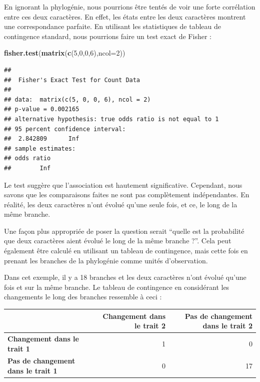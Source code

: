 \documentclass[
]{book}
\newenvironment{Shaded}{\begin{snugshade}}{\end{snugshade}}
\newcommand{\AttributeTok}[1]{\textcolor[rgb]{0.13,0.29,0.53}{#1}}
\newcommand{\DecValTok}[1]{\textcolor[rgb]{0.00,0.00,0.81}{#1}}
\newcommand{\FunctionTok}[1]{\textcolor[rgb]{0.13,0.29,0.53}{\textbf{#1}}}
\newcommand{\NormalTok}[1]{#1}
\begin{document}
En ignorant la phylogénie, nous pourrions être tentés de voir une forte corrélation entre ces deux caractères. En effet, les états entre les deux caractères montrent une correspondance parfaite. En utilisant les statistiques de tableau de contingence standard, nous pourrions faire un test exact de Fisher :

\begin{Shaded}
\begin{Highlighting}[]
\FunctionTok{fisher.test}\NormalTok{(}\FunctionTok{matrix}\NormalTok{(}\FunctionTok{c}\NormalTok{(}\DecValTok{5}\NormalTok{,}\DecValTok{0}\NormalTok{,}\DecValTok{0}\NormalTok{,}\DecValTok{6}\NormalTok{),}\AttributeTok{ncol=}\DecValTok{2}\NormalTok{))}
\end{Highlighting}
\end{Shaded}

\begin{verbatim}
## 
##  Fisher's Exact Test for Count Data
## 
## data:  matrix(c(5, 0, 0, 6), ncol = 2)
## p-value = 0.002165
## alternative hypothesis: true odds ratio is not equal to 1
## 95 percent confidence interval:
##  2.842809      Inf
## sample estimates:
## odds ratio 
##        Inf
\end{verbatim}

Le test suggère que l'association est hautement significative. Cependant, nous savons que les comparaisons faites ne sont pas complètement indépendantes. En réalité, les deux caractères n'ont évolué qu'une seule fois, et ce, le long de la même branche.

Une façon plus appropriée de poser la question serait ``quelle est la probabilité que deux caractères aient évolué le long de la même branche ?''. Cela peut également être calculé en utilisant un tableau de contingence, mais cette fois en prenant les branches de la phylogénie comme unités d'observation.

Dans cet exemple, il y a 18 branches et les deux caractères n'ont évolué qu'une fois et sur la même branche. Le tableau de contingence en considérant les changements le long des branches ressemble à ceci :

\begin{tabular}{>{}l|r|r}
\hline
  & Changement dans le trait 2 & Pas de changement dans le trait 2\\
\hline
\textbf{Changement dans le trait 1} & 1 & 0\\
\hline
\textbf{Pas de changement dans le trait 1} & 0 & 17\\
\hline
\end{tabular}
\end{document}
